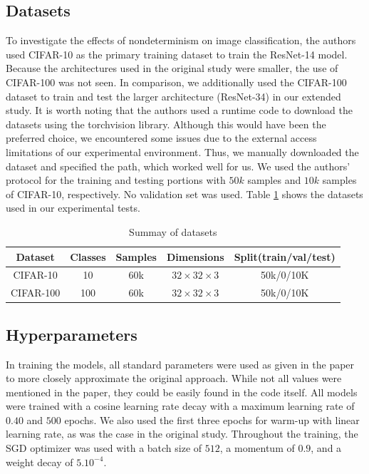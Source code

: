 \subsection{Datasets}
To investigate the effects of nondeterminism on image classification, the authors used CIFAR-10 as the primary training dataset to train the ResNet-14 model. Because the architectures used in the original study were smaller, the use of CIFAR-100 was not seen. In comparison, we additionally used the CIFAR-100 dataset to train and test the larger architecture (ResNet-34) in our extended study. It is worth noting that the authors used a runtime code to download the datasets using the torchvision library. Although this would have been the preferred choice, we encountered some issues due to the external access limitations of our experimental environment. Thus, we manually downloaded the dataset and specified the path, which worked well for us. We used the authors' protocol for the training and testing portions with $50k$ samples and $10k$ samples of CIFAR-10, respectively. No validation set was used. Table \ref{table:table2}  shows the datasets used in our experimental tests.
\begin{table}[!hb]
\centering
	\begin{tabular}{|c|c|c|c|c|}
	\hline
    Dataset & Classes & Samples& Dimensions& Split(train/val/test)\\
	\hline
		CIFAR-10 & 10 & 60k & $32 \times 32 \times 3$ & 50k/0/10K \\
	    CIFAR-100 & 100 & 60k & $32 \times 32 \times 3$ & 50k/0/10K \\
		\hline
	\end{tabular}
	\caption{Summay of datasets}
	\label{table:table2}
\end{table}
\subsection{Hyperparameters}
 In training the models, all standard parameters were used as given in the paper to more closely approximate the original approach. While not all values were mentioned in the paper, they could be easily found in the code itself. All models were trained with a cosine learning rate decay \citep{loshchilov2016sgdr} with a maximum learning rate of $0.40$ and  $500$ epochs. We also used the first three epochs for warm-up with linear learning rate, as was the case in the original study. Throughout the training, the SGD optimizer was used with a batch size of $512$, a momentum of $0.9$, and a weight decay of $5.10^{-4}$. 
 
